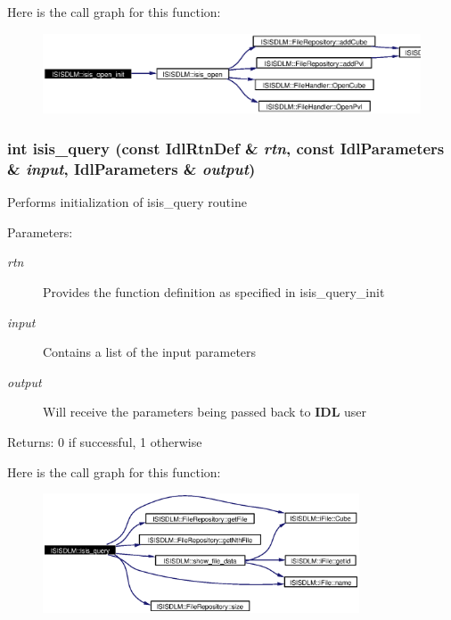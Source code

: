 Here is the call graph for this function:\begin{figure}[H]
\begin{center}
\leavevmode
\includegraphics[width=340pt]{namespaceISISDLM_a19_cgraph}
\end{center}
\end{figure}
\subsubsection{\setlength{\rightskip}{0pt plus 5cm}int isis\_\-query (const Idl\-Rtn\-Def \& {\em rtn}, const Idl\-Parameters \& {\em input}, Idl\-Parameters \& {\em output})}\label{namespaceISISDLM_a23}


Performs initialization of isis\_\-query routine \begin{Desc}
\item[Parameters:]
\begin{description}
\item[{\em rtn}]Provides the function definition as specified in isis\_\-query\_\-init \item[{\em input}]Contains a list of the input parameters \item[{\em output}]Will receive the parameters being passed back to {\bf IDL} user \end{description}
\end{Desc}
\begin{Desc}
\item[Returns:]0 if successful, 1 otherwise \end{Desc}


Here is the call graph for this function:\begin{figure}[H]
\begin{center}
\leavevmode
\includegraphics[width=266pt]{namespaceISISDLM_a23_cgraph}
\end{center}
\end{figure}
